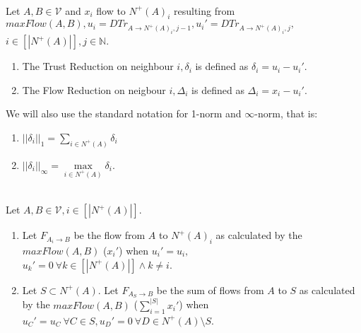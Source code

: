 \documentclass[11pt]{llncs}
\begin{document}
     \begin{definition} \ \\ 
        Let $A, B \in \mathcal{V}$ and $x_i$ flow to $N^{+}(A)_i$ resulting from $maxFlow(A,B), u_i = 
        DTr_{A \rightarrow N^{+}(A)_i,j-1}, u_i' = DTr_{A \rightarrow N^{+}(A)_i,j},$ \\ $i \in [|N^{+}(A)|], 
        j \in \mathbb{N}$. 
        \begin{enumerate} 
           \item The Trust Reduction on neighbour $i, \delta_i$ is defined as $\delta_i = u_i - u_i'$. 
           \item The Flow Reduction on neigbour $i, \Delta_i$ is defined as $\Delta_i = x_i - u_i'$. 
        \end{enumerate} 
        We will also use the standard notation for 1-norm and $\infty$-norm, that is: 
        \begin{enumerate} 
           \item $||\delta_i||_1 = \sum\limits_{i \in N^{+}(A)}\delta_i$ 
           \item $||\delta_i||_\infty = \max\limits_{i \in N^{+}(A)}\delta_i$. 
        \end{enumerate} 
     \end{definition} 
     \begin{definition} \ \\ 
        Let $A, B \in \mathcal{V}, i \in [|N^{+}(A)|]$. 
        \begin{enumerate} 
           \item Let $F_{A_i \rightarrow B}$ be the flow from $A$ to $N^{+}(A)_i$ as calculated by the $maxFlow(A,B)$ 
              ($x_i'$) when $u_i' = u_i,$ \\ $u_k' = 0 \:\forall k \in [|N^{+}(A)|] \wedge k \neq i$. 
           \item Let $S \subset N^{+}(A)$. Let $F_{A_S \rightarrow B}$ be the sum of flows from $A$ to $S$ as 
              calculated by the $maxFlow(A,B)$ ($\sum\limits_{i=1}^{|S|}x_i'$) when $u_C' = u_C \: \forall C \in S, 
              u_D' = 0 \: \forall D \in N^{+}(A) \setminus S$. 
        \end{enumerate} 
     \end{definition} 
\end{document}
